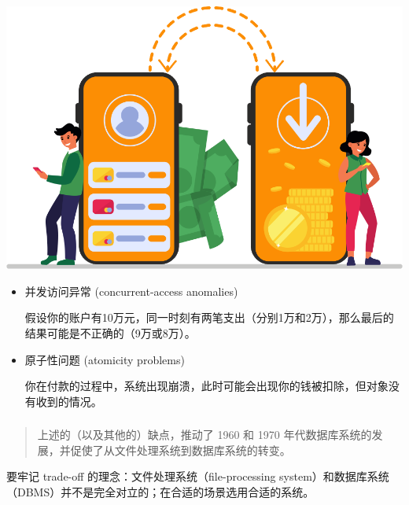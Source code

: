 \documentclass[aspectratio=169, 14pt]{beamer}
\begin{document}
\begin{frame}
	\begin{center}
		\includegraphics[height=.4\paperheight]{image/money}
	\end{center}
	\begin{itemize}
		\item \alert{并发访问异常
		      } (concurrent-access anomalies)

		      假设你的账户有10万元，同一时刻有两笔支出（分别1万和2万），那么最后的结果可能是不正确的（9万或8万）。
		\item \alert{原子性问题} (atomicity problems)

		      你在付款的过程中，系统出现崩溃，此时可能会出现你的钱被扣除，但对象没有收到的情况。
	\end{itemize}

\end{frame}

\begin{frame}
	\frametitle{}

	\begin{quote}
		上述的（以及其他的）缺点，推动了 1960 和 1970 年代数据库系统的发展，并促使了从\alert{文件处理系统}到\alert{数据库系统}的转变。
	\end{quote}

	\begin{center}
		{\Huge {}  }
	\end{center}

	 要牢记 trade-off 的理念：文件处理系统（file-processing system）和数据库系统（DBMS）并不是完全对立的；在合适的场景选用合适的系统。
\end{frame}
\end{document}
